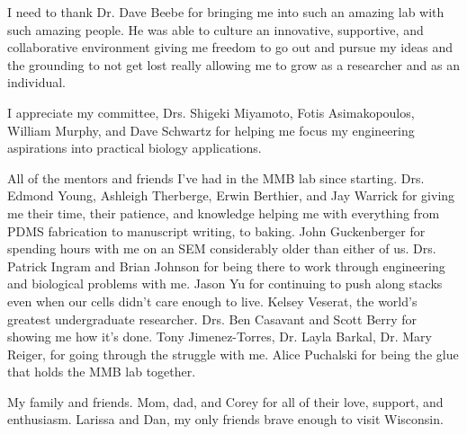 I need to thank Dr. Dave Beebe for bringing me into such an amazing lab with such amazing people. He was able to culture an innovative, supportive, and collaborative environment giving me freedom to go out and pursue my ideas and the grounding to not get lost really allowing me to grow as a researcher and as an individual.

I appreciate my committee, Drs. Shigeki Miyamoto, Fotis Asimakopoulos, William Murphy, and Dave Schwartz for helping me focus my engineering aspirations into practical biology applications.

All of the mentors and friends I've had in the MMB lab since starting. Drs. Edmond Young, Ashleigh Therberge, Erwin Berthier, and Jay Warrick for giving me their time, their patience, and knowledge helping me with everything from PDMS fabrication to manuscript writing, to baking. John Guckenberger for spending hours with me on an SEM considerably older than either of us. Drs. Patrick Ingram and Brian Johnson for being there to work through engineering and biological problems with me. Jason Yu for continuing to push along stacks even when our cells didn't care enough to live. Kelsey Veserat, the world's greatest undergraduate researcher. Drs. Ben Casavant and Scott Berry for showing me how it's done. Tony Jimenez-Torres, Dr. Layla Barkal, Dr. Mary Reiger, for going through the struggle with me. Alice Puchalski for being the glue that holds the MMB lab together.

My family and friends. Mom, dad, and Corey for all of their love, support, and enthusiasm. Larissa and Dan, my only friends brave enough to visit Wisconsin.

